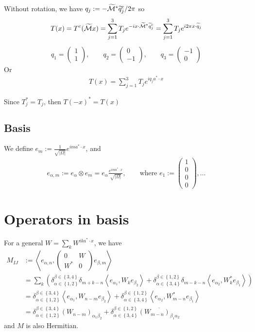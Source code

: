 \documentclass[11pt,a4paper,reqno,french,tikz]{amsart}
\newcommand{\pa}[1]{\left( #1 \right)} %
\newcommand{\acs}[1]{\left\{ #1 \right\}} %
\newcommand{\ab}[1]{\left|#1\right|} %
\newcommand{\ps}[1]{\left< #1 \right>} %
\newcommand{\f}[2]{\frac{#1}{#2}} %
\newcommand{\mat}[1]{\begin{pmatrix} #1 \end{pmatrix}} %
\begin{document}
Without rotation, we have $q_j := -\widetilde{\mathcal{M}}^* \widetilde{q}^c_j /2\pi$ so
\begin{align*}
T(x) = T^c(\widetilde{\mathcal{M}} x) = \sum_{j=1}^3 T_j e^{-ix\cdot \widetilde{\mathcal{M}}^* \widetilde{q}_j^c}= \sum_{j=1}^3 T_j e^{i2\pi x\cdot \widetilde{q}_j}
\end{align*}
\begin{align*}
\boxed{q_1 = \mat{1 \\ 1}, \qquad q_{2} = \mat{0 \\ -1}, \qquad q_{3} = \mat{-1 \\ 0}}
\end{align*}
Or
\begin{align*}
\boxed{T(x) = \sum_{j=1}^3 T_j e^{i q_j a^* \cdot x}}
\end{align*}

Since $T_j^* = T_j$, then $T(-x)^* = T(x)$

\subsection{Basis}%
\label{sub:basis}

We define $e_m := \f{1}{\sqrt{\ab{\Omega}}} e^{i m a^* \cdot x}$, and
\begin{align*}
e_{\alpha,m} := e_\alpha \otimes e_m = e_\alpha \f{e^{ima^*\cdot x}}{\sqrt{\ab{\Omega}}}, \qquad \text{where } e_1 := \mat{1 \\ 0 \\ 0 \\ 0},\dots
\end{align*}


\section{Operators in basis}%
\label{sec:operators_in_basis}



For a general $W = \sum_{k} W^{ik a^* \cdot x}$, we have
\begin{align*}
	M_{IJ} & := \ps{e_{\alpha,n}, \mat{0 & W \\ W^* & 0} e_{\beta,m}} \\
	       &= \sum_{k} \pa{\delta_{\alpha \in \acs{1,2}}^{\beta \in \acs{3,4}} \delta_{m+k-n} \ps{e_{\alpha_1},W_k e_{\beta_2}} + \delta_{\alpha \in \acs{3,4}}^{\beta \in \acs{1,2}}\delta_{m-k-n} \ps{e_{\alpha_2},W_k^* e_{\beta_1}}} \\
	       &=   \delta_{\alpha \in \acs{1,2}}^{\beta \in \acs{3,4}}\ps{e_{\alpha_1},W_{n-m} e_{\beta_2}} + \delta_{\alpha \in \acs{3,4}}^{\beta \in \acs{1,2}}\ps{e_{\alpha_2},W_{m-n}^* e_{\beta_1}} \\
	       &=     \delta_{\alpha \in \acs{1,2}}^{\beta \in \acs{3,4}}\pa{W_{n-m}}_{\alpha_1 \beta_2} + \delta_{\alpha \in \acs{3,4}}^{\beta \in \acs{1,2}} \overline{\pa{W_{m-n}}_{\beta_1\alpha_2} }
\end{align*}
and $M$ is also Hermitian.
\end{document}
